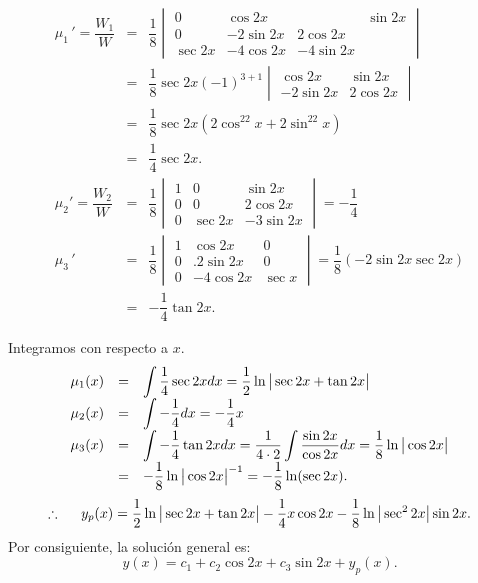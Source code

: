 \documentclass[9pt]{beamer}
\begin{document}
\begin{frame}[t]
	\begin{exampleblock}{}
		\[
			\begin{array}{rcl}
				\mu _1\,' = \dfrac{W_1}{W} & = & \dfrac{1}{8} \begin{vmatrix}
					0 & \cos 2x & & \sin 2x \\
					0 & -2 \sin 2x & 2 \cos 2x \\
					\sec 2x & -4 \cos 2x & -4 \sin 2x
				\end{vmatrix}\\[2mm]
				& = & \dfrac{1}{8} \sec 2x (-1) ^{3+1} \begin{vmatrix}
					\cos 2x & \sin 2x \\
					-2 \sin 2x & 2 \cos 2x
				\end{vmatrix}\\[2mm]
				& = & \dfrac{1}{8} \sec 2x(2 \cos ^22x+2 \sin ^22x) \\[2mm]
				& = & \dfrac{1}{4} \sec 2x. \\[5mm]
				\mu _2' = \dfrac{W_2}{W} & = & \dfrac{1}{8} \begin{vmatrix}
					1 & 0 & \sin 2x \\
					0 & 0 & 2 \cos 2x \\
					0 & \sec 2x & -3 \sin 2x
				\end{vmatrix} = - \dfrac{1}{4} \\[5mm]
				\mu _3\,' & = & \dfrac{1}{8} \begin{vmatrix}
					1 & \cos 2x & 0 \\
					0 & .2 \sin 2x & 0 \\
					0 & -4 \cos 2x & \sec x
				\end{vmatrix} = \dfrac{1}{8} (-2 \sin 2x \sec 2x)\\[2mm]
				& = & - \dfrac{1}{4} \tan 2x.
			\end{array}
		\]
	\end{exampleblock}
\end{frame}

\begin{frame}[t]
	\begin{exampleblock}{}
		Integramos con respecto a \(x\).
		\[
			\begin{array}{rcl}
				\mu _1(x) & = & \displaystyle\int \dfrac{1}{4} \sec 2xdx = \dfrac{1}{2} \ln \big| \sec 2x+ \tan 2x \big| \\[2mm]
				\mu _2(x) & = & \displaystyle\int - \dfrac{1}{4} dx = - \dfrac{1}{4} x \\[2mm]
				\mu _3(x) & = & \displaystyle\int - \dfrac{1}{4} \tan 2xdx = \dfrac{1}{4 \cdot 2} \displaystyle\int \dfrac{\sin 2x}{\cos 2x} dx = \dfrac{1}{8} \ln \big| \cos 2x \big| \\[2mm]
				& = & - \dfrac{1}{8} \ln \big| \cos 2x \big| ^{-1} = - \dfrac{1}{8} \ln (\sec 2x).
			\end{array}
		\]
		\[
			\therefore \hspace{5mm} y_p(x) = \dfrac{1}{2} \ln \big| \sec 2x+ \tan 2x \big| - \dfrac{1}{4} x \cos 2x- \dfrac{1}{8} \ln \big| \sec ^22x \big| \sin 2x.
		\]
		Por consiguiente, la solución general es:
		\[
			y(x) = c_1+c_2 \cos 2x+ c_3 \sin 2x+y_p(x).
		\]
	\end{exampleblock}
\end{frame}
\end{document}
